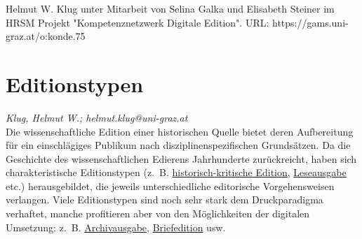 \documentclass{article}
\begin{document}
Helmut W. Klug unter Mitarbeit von Selina Galka und Elisabeth Steiner im HRSM Projekt "Kompetenznetzwerk Digitale Edition". URL: https://gams.uni-graz.at/o:konde.75\newpage\section*{Editionstypen} \emph{Klug, Helmut W.; helmut.klug@uni-graz.at }\\
        
    Die wissenschaftliche Edition einer historischen Quelle bietet deren Aufbereitung für ein einschlägiges Publikum nach disziplinenspezifischen Grundsätzen. Da die Geschichte des wissenschaftlichen Edierens Jahrhunderte zurückreicht, haben sich charakteristische Editionstypen (z. B. \href{http://gams.uni-graz.at/o:konde.93}{historisch-kritische Edition}, \href{http://gams.uni-graz.at/o:konde.116}{Leseausgabe} etc.) herausgebildet, die jeweils unterschiedliche editorische Vorgehensweisen verlangen. Viele Editionstypen sind noch sehr stark dem Druckparadigma verhaftet, manche profitieren aber von den Möglichkeiten der digitalen Umsetzung: z. B. \href{http://gams.uni-graz.at/o:konde.33}{Archivausgabe}, \href{http://gams.uni-graz.at/o:konde.39}{Briefedition} usw.\\
            
\end{document}
